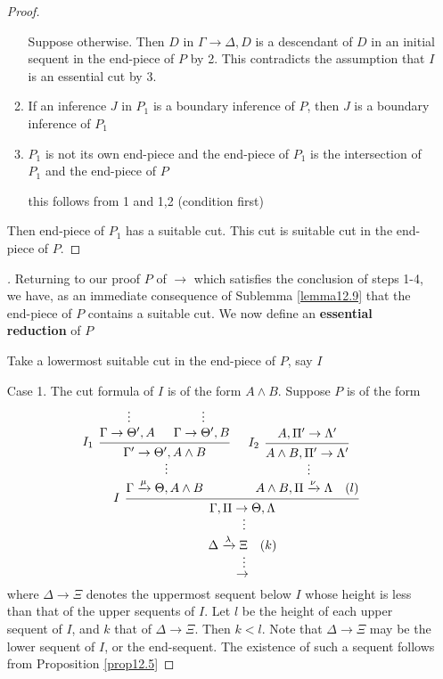 \documentclass[11pt]{article}
\begin{document}
\begin{enumerate}
\begin{proof}
\begin{enumerate}
Suppose otherwise. Then \(D\) in \(\Gamma \to \Delta,D\) is a descendant of \(D\) in an initial sequent
in the end-piece of \(P\) by 2. This contradicts the assumption that \(I\) is an essential
cut by 3.

\item If an inference \(J\) in \(P_1\) is a boundary inference of \(P\), then \(J\) is a boundary
inference of \(P_1\)

\item \(P_1\) is not its own end-piece and the end-piece of \(P_1\) is the intersection of \(P_1\)
and the end-piece of \(P\)

this follows from 1 and 1,2 (condition first)
\end{enumerate}


Then end-piece of \(P_1\) has a suitable cut. This cut is suitable cut in the end-piece of \(P\).
\end{proof}

\begin{proof}[\cite{lemma12.8}]
Returning to our proof \(P\) of \(\to\) which satisfies the conclusion of steps 1-4, we have,
as an immediate consequence of Sublemma \ref{lemma12.9} that the end-piece of \(P\) contains a
suitable cut. We now define an \textbf{essential reduction} of \(P\)

Take a lowermost suitable cut in the end-piece of \(P\), say \(I\)

Case 1. The cut formula of \(I\) is of the form \(A\wedge B\). Suppose \(P\) is of the form
\begin{equation*}
\begin{prooftree}%
\hypo{}
\ellipsis{}{\Gamma \to \Theta',A}
\hypo{}
\ellipsis{}{\Gamma\to\Theta',B}
\infer[left label=\(I_1\)]2{\Gamma'\to\Theta',A\wedge B}
\ellipsis{}{\Gamma\xrightarrow{\mu}\Theta,A\wedge B}
\hypo{A,\Pi'\to\Lambda'}
\infer[left label=\(I_2\)]1{A\wedge B,\Pi'\to\Lambda'}
\ellipsis{}{A\wedge B,\Pi\xrightarrow{\nu}\Lambda\quad (l)}
\infer[left label=\(I\)]2{\Gamma,\Pi \to \Theta,\Lambda}
\ellipsis{}{\Delta\xrightarrow{\lambda}\Xi\quad(k)}
\ellipsis{}{\to}
\end{prooftree}
\end{equation*}
where \(\Delta \to \Xi\) denotes the uppermost sequent below \(I\) whose height is less than that of
the upper sequents of \(I\). Let \(l\) be the height of each upper sequent of \(I\), and \(k\)
that of \(\Delta \to \Xi\). Then \(k<l\). Note that \(\Delta \to \Xi\) may be the lower sequent of \(I\), or
the end-sequent. The existence of such a sequent follows from Proposition \ref{prop12.5}


\end{proof}
\end{enumerate}
\end{document}
